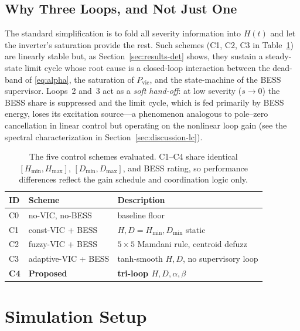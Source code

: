 \documentclass[journal]{IEEEtran}
\begin{document}
\subsection{Why Three Loops, and Not Just One}
\label{sec:why}
The standard simplification is to fold all severity information into
$H(t)$ and let the inverter's saturation provide the rest. Such schemes
(C1, C2, C3 in Table~\ref{tab:schemes}) are linearly stable but, as
Section~\ref{sec:results-det} shows, they sustain a steady-state limit
cycle whose root cause is a closed-loop interaction between the
dead-band of \eqref{eq:alpha}, the saturation of $P_\mathrm{vic}$, and
the state-machine of the BESS supervisor. Loops~2 and~3 act as a
\emph{soft hand-off}: at low severity ($s\to 0$) the BESS share is
suppressed and the limit cycle, which is fed primarily by BESS energy,
loses its excitation source---a phenomenon analogous to pole--zero
cancellation in linear control but operating on the nonlinear loop
gain (see the spectral characterization in Section~\ref{sec:discussion-lc}).

\begin{table}[t]
\caption{The five control schemes evaluated. C1--C4 share identical
$[H_\mathrm{min},H_\mathrm{max}]$, $[D_\mathrm{min},D_\mathrm{max}]$,
and BESS rating, so performance differences reflect the gain schedule
and coordination logic only.}
\label{tab:schemes}
\centering
\renewcommand{\arraystretch}{1.05}
\begin{tabular}{@{}lll@{}}
\toprule
ID & Scheme & Description \\
\midrule
C0 & no-VIC, no-BESS & baseline floor \\
C1 & const-VIC + BESS & $H,D=H_\mathrm{min},D_\mathrm{min}$ static \\
C2 & fuzzy-VIC + BESS & $5\times 5$ Mamdani rule, centroid defuzz \\
C3 & adaptive-VIC + BESS & tanh-smooth $H,D$, no supervisory loop \\
\textbf{C4} & \textbf{Proposed} & \textbf{tri-loop $H,D,\alpha,\beta$} \\
\bottomrule
\end{tabular}
\end{table}

\section{Simulation Setup}\label{sec:setup}
\end{document}
